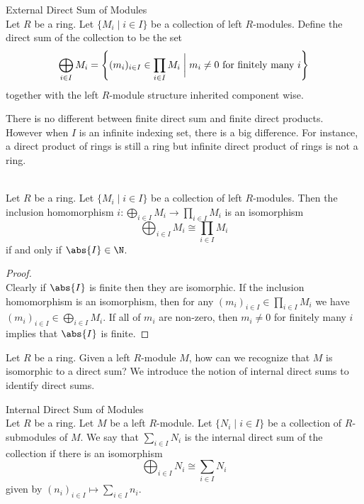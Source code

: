 \documentclass[a4paper]{article}
\begin{document}
\begin{defn}{External Direct Sum of Modules}{}\\
Let $R$ be a ring. Let $\{M_i\;|\;i\in I\}$ be a collection of left $R$-modules. Define the direct sum of the collection to be the set $$\bigoplus_{i\in I}M_i=\left\{(m_i)_{i\in I}\in\prod_{i\in I}M_i\;\bigg{|}\;m_i\neq 0\text{ for finitely many }i\right\}$$ together with the left $R$-module structure inherited component wise. 
\end{defn}

There is no different between finite direct sum and finite direct products. However when $I$ is an infinite indexing set, there is a big difference. For instance, a direct product of rings is still a ring but infinite direct product of rings is not a ring. 

\begin{prp}{}{}\\
Let $R$ be a ring. Let $\{M_i\;|\;i\in I\}$ be a collection of left $R$-modules. Then the inclusion homomorphism $i:\bigoplus_{i\in I}M_i\to\prod_{i\in I}M_i$ is an isomorphism $$\bigoplus_{i\in I}M_i\cong\prod_{i\in I}M_i$$ if and only if $\abs{I}\in\N$. 
\begin{proof}\\
Clearly if $\abs{I}$ is finite then they are isomorphic. If the inclusion homomorphism is an isomorphism, then for any $(m_i)_{i\in I}\in\prod_{i\in I}M_i$ we have $(m_i)_{i\in I}\in\bigoplus_{i\in I}M_i$. If all of $m_i$ are non-zero, then $m_i\neq 0$ for finitely many $i$ implies that $\abs{I}$ is finite. 
\end{proof}
\end{prp}

Let $R$ be a ring. Given a left $R$-module $M$, how can we recognize that $M$ is isomorphic to a direct sum? We introduce the notion of internal direct sums to identify direct sums. 

\begin{defn}{Internal Direct Sum of Modules}{}\\
Let $R$ be a ring. Let $M$ be a left $R$-module. Let $\{N_i\;|\;i\in I\}$ be a collection of $R$-submodules of $M$. We say that $\sum_{i\in I}N_i$ is the internal direct sum of the collection if there is an isomorphism $$\bigoplus_{i\in I}N_i\cong\sum_{i\in I}N_i$$ given by $(n_i)_{i\in I}\mapsto\sum_{i\in I}n_i$. 
\end{defn}
\end{document}
